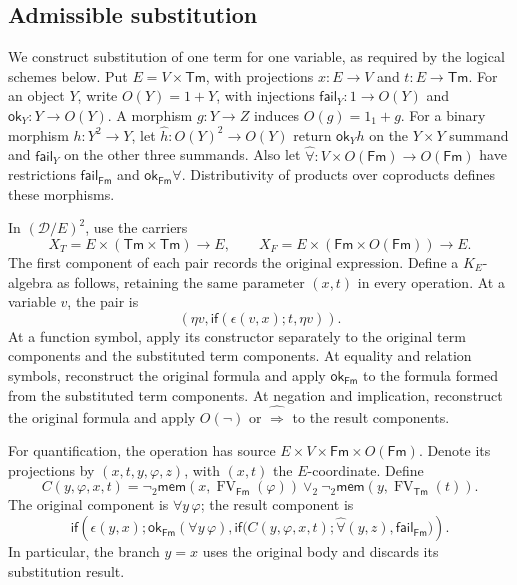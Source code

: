 \documentclass[11pt]{article}
\theoremstyle{definition}\newtheorem{definition}[theorem]{Definition}
\newcommand{\Tm}{\mathsf{Tm}}
\newcommand{\Fm}{\mathsf{Fm}}
\newcommand{\FV}{\operatorname{FV}}
\newcommand{\mem}{\mathsf{mem}}
\newcommand{\ok}{\mathsf{ok}}
\newcommand{\fail}{\mathsf{fail}}
\begin{document}
\subsection{Admissible substitution}
\label{app:substitution}

We construct substitution of one term for one variable, as required
by the logical schemes below. Put $E=V\times\Tm$, with projections
$x:E\to V$ and $t:E\to\Tm$. For an object $Y$, write
$O(Y)=1+Y$, with injections $\fail_Y:1\to O(Y)$ and
$\ok_Y:Y\to O(Y)$. A morphism $g:Y\to Z$ induces
$O(g)=1_1+g$. For a binary morphism $h:Y^2\to Y$, let
$\widehat h:O(Y)^2\to O(Y)$ return $\ok_Yh$ on the
$Y\times Y$ summand and $\fail_Y$ on the other three summands.
Also let $\widehat\forall:V\times O(\Fm)\to O(\Fm)$ have
restrictions $\fail_{\Fm}$ and $\ok_{\Fm}\forall$.
Distributivity of products over coproducts defines these morphisms.

In $(\mathcal D/E)^2$, use the carriers
\[
 X_T=E\times(\Tm\times\Tm)\longrightarrow E,
 \qquad
 X_F=E\times(\Fm\times O(\Fm))\longrightarrow E.
\]
The first component of each pair records the original expression.
Define a $K_E$-algebra as follows, retaining the same parameter
$(x,t)$ in every operation. At a variable $v$, the pair is
\[
 (\eta v,\mathsf{if}(\epsilon(v,x);t,\eta v)).
\]
At a function symbol, apply its constructor separately to the
original term components and the substituted term components.
At equality and relation symbols, reconstruct the original formula
and apply $\ok_{\Fm}$ to the formula formed from the substituted
term components. At negation and implication, reconstruct the
original formula and apply $O(\neg)$ or
$\widehat{\Rightarrow}$ to the result components.

For quantification, the operation has source
$E\times V\times\Fm\times O(\Fm)$.
Denote its projections by $(x,t,y,\varphi,z)$, with $(x,t)$ the
$E$-coordinate. Define
\[
 C(y,\varphi,x,t)=
 \neg_2\mem(x,\FV_{\Fm}(\varphi))
 \vee_2\neg_2\mem(y,\FV_{\Tm}(t)).
\]
The original component is $\forall y\,\varphi$; the result component is
\begin{equation}\label{eq:quantifier-fold}
 \mathsf{if}\left(\epsilon(y,x);
   \ok_{\Fm}(\forall y\,\varphi),
   \mathsf{if}\bigl(C(y,\varphi,x,t);
          \widehat\forall(y,z),\fail_{\Fm}\bigr)\right).
\end{equation}
In particular, the branch $y=x$ uses the original body and discards
its substitution result.
\end{document}
